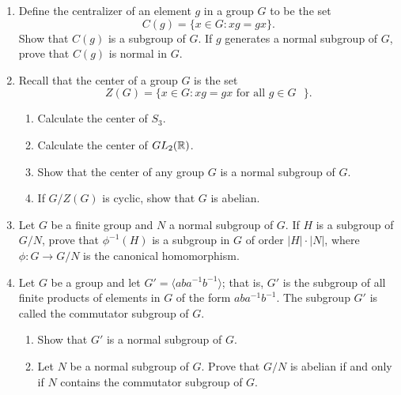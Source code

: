 {\begin{enumerate}
 
\bf\item\rm
Define the {\bfi centralizer\/} of an element $g$ in a group $G$
to be the set  
$$
C(g) = \{ x \in G : xg = gx \}.
$$
Show that $C(g)$ is a subgroup of $G$.  If $g$ generates a normal
subgroup of $G$, prove that $C(g)$ is normal in $G$.
 
 
\bf\item\rm
Recall that the {\bfi center\/} of a group $G$ is
the set 
$$
Z(G) = \{ x \in G : xg = gx \mbox{ for all $g \in G$ } \}.
$$
\begin{enumerate}
 
 \bf\item\rm
Calculate the center of $S_3$.
 
 \bf\item\rm
Calculate the center of $GL_2 ( {\Bbb R} )$.
 
 \bf\item\rm
Show that the center of any group $G$ is a normal subgroup of $G$. 
 
 \bf\item\rm
If $G / Z(G)$ is cyclic, show that $G$ is abelian.
 
\end{enumerate}
 
 
\bf\item\rm
Let $G$ be a finite group and $N$ a normal subgroup of $G$. If $H$ is
a subgroup of $G/N$, prove that $\phi^{-1}(H)$ is a subgroup in $G$ of
order $|H| \cdot |N|$, where $\phi : G \rightarrow G/N$ is the
canonical homomorphism. 
 
 
\bf\item\rm
Let $G$ be a group and let $G' = \langle aba^{- 1} b^{-1} \rangle$;
that is, $G'$ is the subgroup of all finite products of elements in
$G$ of the form $aba^{-1}b^{-1}$.  The subgroup $G'$ is called the
{\bfi commutator
subgroup\/}\label{commutatorsubgroup} of $G$.  
\begin{enumerate}
 
 \bf\item\rm
Show that $G'$ is a normal subgroup of $G$.

 \bf\item\rm
Let $N$ be  a normal subgroup of $G$.  Prove that $G/N$ is abelian if
and only if $N$ contains the commutator subgroup of $G$.
 
\end{enumerate}


\end{enumerate}}
